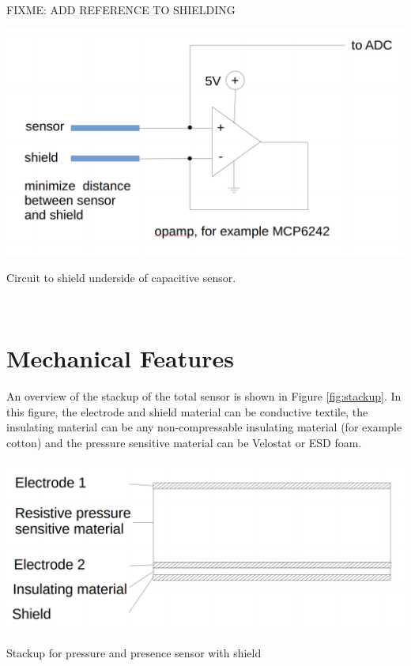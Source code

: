 \documentclass{sigchi-ext}
\begin{document}
FIXME: ADD REFERENCE TO SHIELDING

\begin{marginfigure}
\begin{minipage}{\marginparwidth}
\centering
\includegraphics[width=0.9\columnwidth]{figures/shield_circuit}
  \caption{Circuit to shield underside of capacitive
sensor.}~\label{fig:shield_circuit}
\end{minipage}
\end{marginfigure}

\section{Mechanical Features}
An overview of the stackup of the total sensor is shown in Figure
\ref{fig:stackup}. In this figure, the electrode and shield material can be
conductive textile, the insulating material can be any non-compressable
insulating material (for example cotton) and the pressure sensitive material can
be Velostat or ESD foam.


\begin{marginfigure}
\begin{minipage}{\marginparwidth}
\centering
\includegraphics[width=0.9\columnwidth]{figures/stackup}
\caption{Stackup for pressure and presence sensor with
shield}~\label{fig:stackup}
\end{minipage}
\end{marginfigure}
\end{document}
